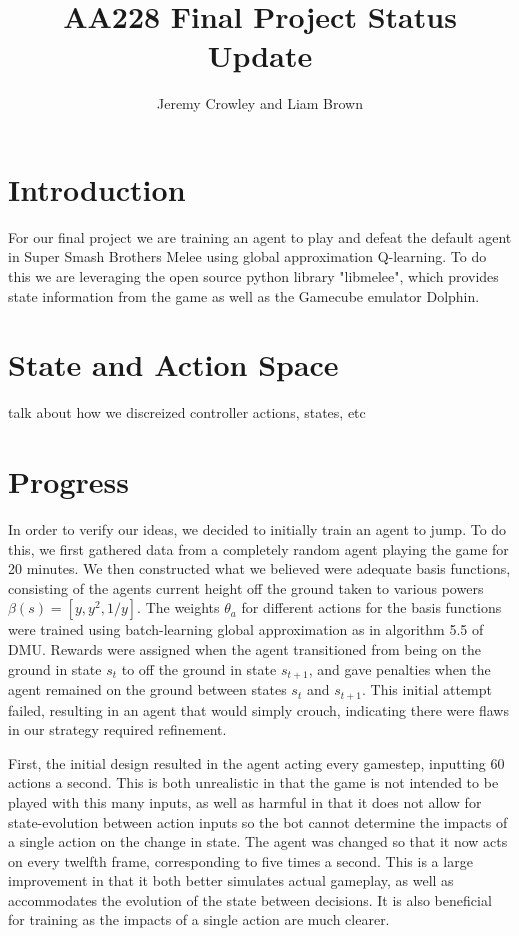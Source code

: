 \documentclass[11pt]{article}
\title{\vspace{-0cm}AA228 Final Project Status Update}
\author{Jeremy Crowley and Liam Brown}
\begin{document}
\maketitle

\section{Introduction}
For our final project we are training an agent to play and defeat the default agent in Super Smash Brothers Melee using global approximation Q-learning. To do this we are leveraging the open source python library "libmelee", which provides state information from the game as well as the Gamecube emulator Dolphin.

\section{State and Action Space}
talk about how we discreized controller actions, states, etc

\section{Progress}
In order to verify our ideas, we decided to initially train an agent to jump. To do this, we first gathered data from a completely random agent playing the game for 20 minutes. We then constructed what we believed were adequate basis functions, consisting of the agents current height off the ground taken to various powers $\beta(s) = [y, y^2, 1/y]$. The weights $\theta_a$ for different actions for the basis functions were trained using batch-learning global approximation as in algorithm 5.5 of DMU\cite{DMU}. Rewards were assigned when the agent transitioned from being on the ground in state $s_t$ to off the ground in state $s_{t+1}$, and gave penalties when the agent remained on the ground between states $s_t$ and $s_{t+1}$. This initial attempt failed, resulting in an agent that would simply crouch, indicating there were flaws in our strategy required refinement.

First, the initial design resulted in the agent acting every gamestep, inputting 60 actions a second. This is both unrealistic in that the game is not intended to be played with this many inputs, as well as harmful in that it does not allow for state-evolution between action inputs so the bot cannot determine the impacts of a single action on the change in state. The agent was changed so that it now acts on every twelfth frame, corresponding to five times a second. This is a large improvement in that it both better simulates actual gameplay, as well as accommodates the evolution of the state between decisions. It is also beneficial for training as the impacts of a single action are much clearer.
\end{document}
